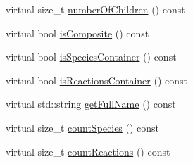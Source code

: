 \begin{DoxyCompactItemize}
\item 
virtual size\-\_\-t \hyperlink{classchem_1_1Component_a720ec4ef4aaadfec3e47c31451d28637}{number\-Of\-Children} () const 
\item 
virtual bool \hyperlink{classchem_1_1Component_af2c73f75f937d457a55c1e0120833cb8}{is\-Composite} () const 
\item 
virtual bool \hyperlink{classchem_1_1Component_a3c0f652fe5b6910f07c046fe0190b7b5}{is\-Species\-Container} () const 
\item 
virtual bool \hyperlink{classchem_1_1Component_a8c79ee4335fadfcef56b14a62b742457}{is\-Reactions\-Container} () const 
\item 
virtual std\-::string \hyperlink{classchem_1_1Component_a1d5884d373fb44fd950d5fe2b0c34e26}{get\-Full\-Name} () const 
\item 
virtual size\-\_\-t \hyperlink{classchem_1_1Component_a581a3912035ba493a2a24f1516d65ea8}{count\-Species} () const 
\item 
virtual size\-\_\-t \hyperlink{classchem_1_1Component_ab061b8b7d97db554af402ebb9723dc4c}{count\-Reactions} () const 
\end{DoxyCompactItemize}
